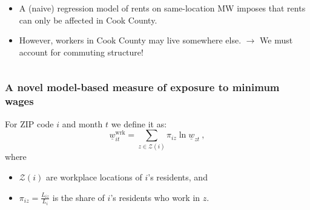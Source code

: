 \documentclass[aspectratio=169, t]{beamer}
\newcommand{\Z}{\mathcal{Z}}
\begin{document}
\begin{frame}
\begin{columns}
\begin{column}{0.56\textwidth}
\begin{itemize}
                \vspace{2mm}
                \pause
                \item A (naive) regression model of rents on same-location MW imposes 
                that rents can only be affected in Cook County.
                \vspace{2mm}
                \pause
                \item However, workers in Cook County may live somewhere else. 
                $\to$ We must account for commuting structure!
            \end{itemize}
        \end{column}
    \end{columns}
\end{frame}

\begin{frame}
\frametitle{A novel model-based measure of exposure to minimum wages}

    For ZIP code $i$ and month $t$ we define it as:
    $$
    \underline{w}^{\text{wrk}}_{it} = 
    \sum_{z \in \Z(i)} \pi_{i z} \ln \underline{w}_{zt} \ ,
    $$
    \vspace{-2.5mm}
    where
    \vspace{1mm}
    \begin{itemize} \small
        \item $\Z(i)$ are workplace locations of $i$'s residents, and
        \item $\pi_{i z} = \frac{L_{i z}}{L_i}$ is the share of $i$'s residents who work 
        in $z$.
    \end{itemize}
\end{frame}
\end{document}
